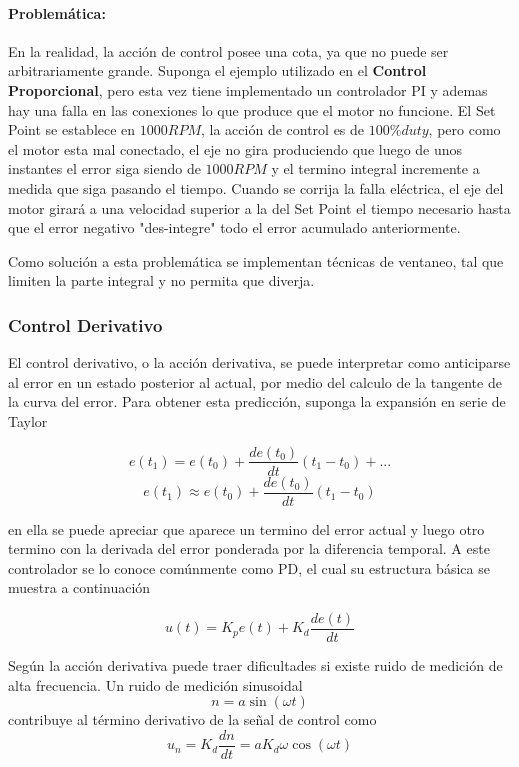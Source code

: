 \documentclass[10pt,conference,a4paper,onecolumn]{article}%
\begin{document}
\paragraph{Problemática:} En la realidad, la acción de control posee una cota, ya que no puede ser arbitrariamente grande. 
Suponga el ejemplo utilizado en el \textbf{Control Proporcional}, pero esta vez tiene implementado un controlador PI y ademas hay una falla en las conexiones lo que produce que el motor no funcione. El Set Point se establece en $1000RPM$, la acción de control es de $100\%duty$, pero como el motor esta mal conectado, el eje no gira produciendo que luego de unos instantes el error siga siendo de  $1000RPM$ y el termino integral incremente a medida que siga pasando el tiempo. Cuando se corrija la falla eléctrica, el eje del motor girará a una velocidad superior a la del Set Point el tiempo necesario hasta que el error negativo "des-integre" todo el error acumulado anteriormente.

Como solución a esta problemática se implementan técnicas de ventaneo, tal que limiten la parte integral y no permita que diverja.  



\subsubsection{Control Derivativo}
El control derivativo, o la acción derivativa, se puede interpretar como anticiparse al error en un estado posterior al actual, por medio del calculo de la tangente de la curva del error. Para obtener esta predicción, suponga la expansión en serie de Taylor


\begin{equation*}
e(t_1)=e(t_0)+\frac{de(t_0)}{dt}(t_1-t_0)+... 
\end{equation*}
\begin{equation}
 e(t_1) \approx e(t_0)+\frac{de(t_0)}{dt}(t_1-t_0)
\end{equation}

en ella se puede apreciar que aparece un termino del error actual y luego otro termino con la derivada del error ponderada por la diferencia temporal. A este controlador se lo conoce comúnmente como PD, el cual su estructura básica se muestra a continuación

\begin{equation}
u(t)=K_pe(t)+K_d\frac{de(t)}{dt}
\end{equation}

Según \cite[pág. 40]{biblia_PID} la acción derivativa puede traer dificultades si existe ruido de medición de alta frecuencia. Un ruido de medición sinusoidal
\begin{equation*}
n=a\sin(\omega t)
\end{equation*}
contribuye al término derivativo de la señal de control como
\begin{equation*}
u_n=K_d \frac{dn}{dt}=aK_d\omega\cos(\omega t)
\end{equation*}
\end{document}
